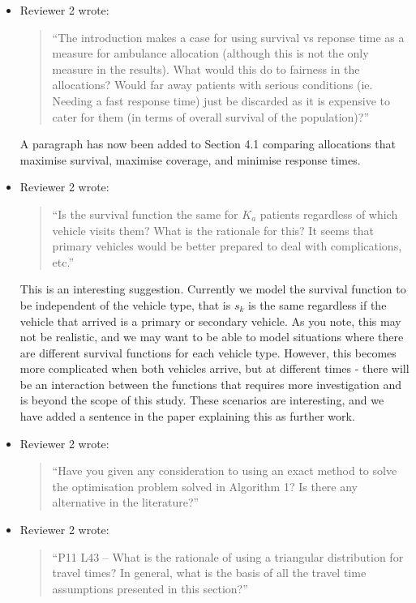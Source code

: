 \documentclass{article}
\begin{document}
\begin{itemize}

\item Reviewer 2 wrote:
\begin{quote}
``The introduction makes a case for using survival vs reponse time as a measure for ambulance allocation (although this is not the only measure in the results). What would this do to fairness in the allocations? Would far away patients with serious conditions (ie. Needing a fast response time) just be discarded as it is expensive to cater for them (in terms of overall survival of the population)?''
\end{quote}
A paragraph has now been added to Section 4.1 comparing allocations that maximise survival, maximise coverage, and minimise response times.

\item Reviewer 2 wrote:
\begin{quote}
``Is the survival function the same for $K_a$ patients regardless of which vehicle visits them? What is the rationale for this? It seems that primary vehicles would be better prepared to deal with complications, etc.''
\end{quote}
This is an interesting suggestion. Currently we model the survival function to be independent of the vehicle type, that is $s_k$ is the same regardless if the vehicle that arrived is a primary or secondary vehicle. As you note, this may not be realistic, and we may want to be able to model situations where there are different survival functions for each vehicle type. However, this becomes more complicated when both vehicles arrive, but at different times - there will be an interaction between the functions that requires more investigation and is beyond the scope of this study. These scenarios are interesting, and we have added a sentence in the paper explaining this as further work.

\item Reviewer 2 wrote:
\begin{quote}
``Have you given any consideration to using an exact method to solve the optimisation problem solved in Algorithm 1? Is there any alternative in the literature?''
\end{quote}

\item Reviewer 2 wrote:
\begin{quote}
``P11 L43 – What is the rationale of using a triangular distribution for travel times? In general, what is the basis of all the travel time assumptions presented in this section?''
\end{quote}


\end{itemize}
\end{document}
